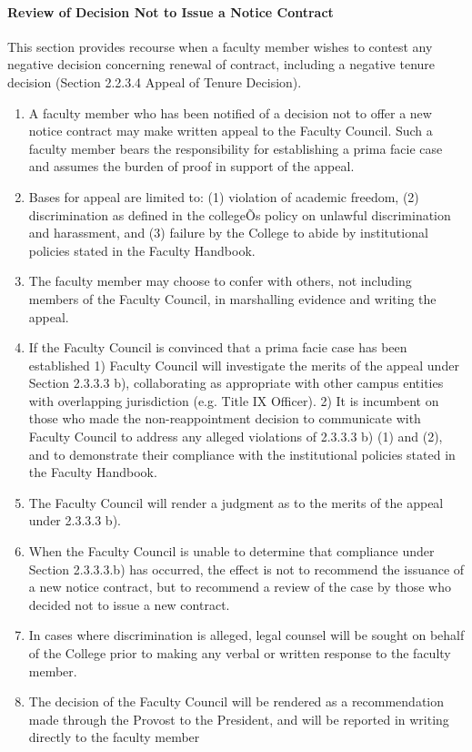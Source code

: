 \documentclass[letterpaper, 11pt]{article}
\begin{document}
			\paragraph{Review of Decision Not to Issue a Notice Contract}
				This section provides recourse when a faculty member wishes to contest any negative decision concerning renewal of contract, including a negative tenure decision (Section 2.2.3.4 Appeal of Tenure Decision).
				\begin{enumerate}[label=\alph*)]
					\item{A faculty member who has been notified of a decision not to offer a new notice contract may make written appeal to the Faculty Council.  Such a faculty member bears the responsibility for establishing a prima facie case and assumes the burden of proof in support of the appeal.}
					\item{Bases for appeal are limited to: (1) violation of academic freedom, (2) discrimination as defined in the collegeÕs policy on unlawful discrimination and harassment, and (3) failure by the College to abide by institutional policies stated in the Faculty Handbook.}
					\item{The faculty member may choose to confer with others, not including members of the Faculty Council, in marshalling evidence and writing the appeal.}
					\item{If the Faculty Council is convinced that a prima facie case has been established}
					1) Faculty Council will investigate the merits of the appeal under Section 2.3.3.3 b), collaborating as appropriate with other campus entities with overlapping jurisdiction (e.g. Title IX Officer).
					2) It is incumbent on those who made the non-reappointment decision to communicate with Faculty Council to address any alleged violations of 2.3.3.3 b) (1) and (2), and to demonstrate their compliance with the institutional policies stated in the Faculty Handbook.
					\item{The Faculty Council will render a judgment as to the merits of the appeal under 2.3.3.3 b).}
					\item{When the Faculty Council is unable to determine that compliance under Section 2.3.3.3.b) has occurred, the effect is not to recommend the issuance of a new notice contract, but to recommend a review of the case by those who decided not to issue a new contract.}
					\item{In cases where discrimination is alleged, legal counsel will be sought on behalf of the College prior to making any verbal or written response to the faculty member.}
					\item{The decision of the Faculty Council will be rendered as a recommendation made through the Provost to the President, and will be reported in writing directly to the faculty member}
				\end{enumerate}
\end{document}
